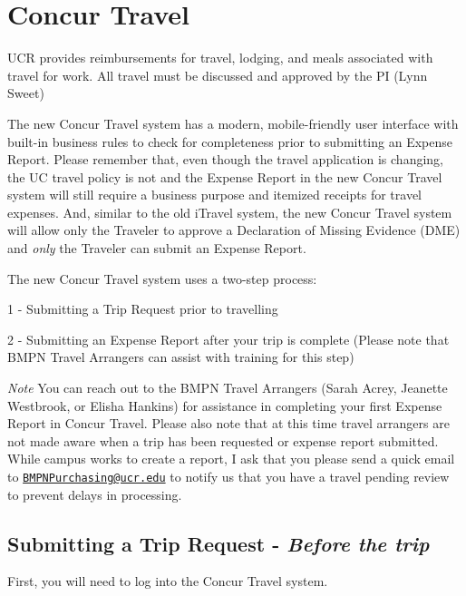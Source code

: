 \documentclass[
]{book}
\begin{document}
\hypertarget{concur}{%
\chapter{Concur Travel}\label{concur}}

UCR provides reimbursements for travel, lodging, and meals associated with travel for work. All travel must be discussed and approved by the PI (Lynn Sweet)

The new Concur Travel system has a modern, mobile-friendly user interface with built-in business rules to check for completeness prior to submitting an Expense Report. Please remember that, even though the travel application is changing, the UC travel policy is not and the Expense Report in the new Concur Travel system will still require a business purpose and itemized receipts for travel expenses. And, similar to the old iTravel system, the new Concur Travel system will allow only the Traveler to approve a Declaration of Missing Evidence (DME) and \emph{only} the Traveler can submit an Expense Report.

The new Concur Travel system uses a two-step process:

1 - Submitting a Trip Request prior to travelling

2 - Submitting an Expense Report after your trip is complete (Please note that BMPN Travel Arrangers can assist with training for this step)

\emph{Note} You can reach out to the BMPN Travel Arrangers (Sarah Acrey, Jeanette Westbrook, or Elisha Hankins) for assistance in completing your first Expense Report in Concur Travel. Please also note that at this time travel arrangers are not made aware when a trip has been requested or expense report submitted. While campus works to create a report, I ask that you please send a quick email to \href{mailto:BMPNPurchasing@ucr.edu}{\nolinkurl{BMPNPurchasing@ucr.edu}} to notify us that you have a travel pending review to prevent delays in processing.

\hypertarget{submitting-a-trip-request---before-the-trip}{%
\section{\texorpdfstring{Submitting a Trip Request - \emph{Before the trip}}{Submitting a Trip Request - Before the trip}}\label{submitting-a-trip-request---before-the-trip}}

First, you will need to log into the Concur Travel system.
\end{document}
